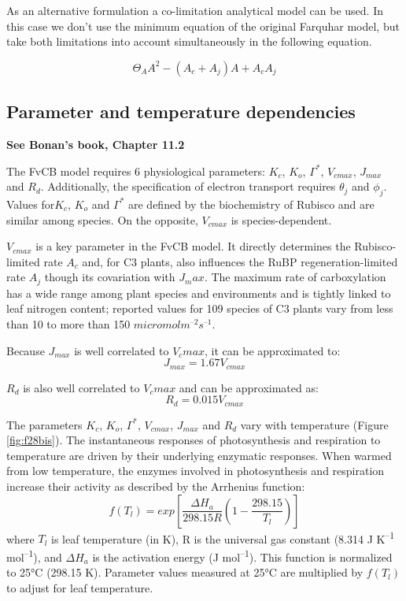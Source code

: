 \documentclass[12pt,oneside]{book}
\begin{document}
As an alternative formulation a co-limitation analytical model can be
used. In this case we don't use the minimum equation of the original
Farquhar model, but take both limitations into account simultaneously in
the following equation.

\[
\Theta_{A}A^2-(A_c+A_j)A+A_cA_j
\]

\subsection{Parameter and temperature
dependencies}\label{parameter-and-temperature-dependencies}

\textbf{See Bonan's book, Chapter 11.2}

The FvCB model requires 6 physiological parameters: \(K_c\), \(K_o\),
\(\Gamma^*\), \(V_{cmax}\), \(J_{max}\) and \(R_d\). Additionally, the
specification of electron transport requires \(\theta_j\) and
\(\phi_j\). Values for\(K_c\), \(K_o\) and \(\Gamma^*\) are defined by
the biochemistry of Rubisco and are similar among species. On the
opposite, \(V_{cmax}\) is species-dependent.

\(V_{cmax}\) is a key parameter in the FvCB model. It directly
determines the Rubisco-limited rate \(A_c\) and, for C3 plants, also
influences the RuBP regeneration-limited rate \(A_j\) though its
covariation with \(J_max\). The maximum rate of carboxylation has a wide
range among plant species and environments and is tightly linked to leaf
nitrogen content; reported values for 109 species of C3 plants vary from
less than 10 to more than 150 \(micromol m^{–2} s^{–1}\).

Because \(J_{max}\) is well correlated to \(V_cmax\), it can be
approximated to: \[
J_{max} = 1.67V_{cmax}
\]

\(R_d\) is also well correlated to \(V_cmax\) and can be approximated
as: \[
R_d=0.015V_{cmax}
\]

The parameters \(K_c\), \(K_o\), \(\Gamma^*\), \(V_{cmax}\), \(J_{max}\)
and \(R_d\) vary with temperature (Figure \ref{fig:f28bis}). The
instantaneous responses of photosynthesis and respiration to temperature
are driven by their underlying enzymatic responses. When warmed from low
temperature, the enzymes involved in photosynthesis and respiration
increase their activity as described by the Arrhenius function: \[
f(T_l)=exp\left[\frac{\Delta H_a}{298.15R}(1-\frac{298.15}{T_l})\right]
\] where \(T_l\) is leaf temperature (in K), R is the universal gas
constant (8.314 J K\textsuperscript{--1} mol\textsuperscript{--1}), and
\(\Delta H_a\) is the activation energy (J mol\textsuperscript{--1}).
This function is normalized to 25°C (298.15 K). Parameter values
measured at 25°C are multiplied by \(f(T_l)\) to adjust for leaf
temperature.
\end{document}
